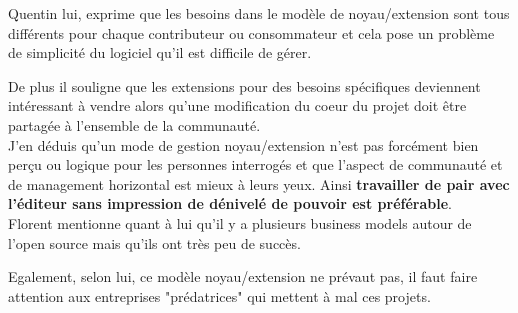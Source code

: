 			\newpage

			Quentin  lui, exprime que les besoins dans le modèle de noyau/extension sont tous différents pour chaque contributeur ou consommateur et cela pose un problème de simplicité du logiciel qu'il est difficile de gérer.

			\begin{center}
				\textit{
				}
			\end{center}

			De plus il souligne que les extensions pour des besoins spécifiques deviennent intéressant à vendre alors qu'une modification du coeur du projet doit être partagée à l'ensemble de la communauté.\\

			J'en déduis qu'un mode de gestion noyau/extension n'est pas forcément bien perçu ou logique pour les personnes interrogés et que l'aspect de communauté et de management horizontal est mieux à leurs yeux. Ainsi \textbf{travailler de pair avec l'éditeur sans impression de dénivelé de pouvoir est préférable}.\\

			Florent  mentionne quant à lui qu'il y a plusieurs business models autour de l'open source mais qu'ils ont très peu de succès.

			\begin{center}
				\textit{
				}
			\end{center}

			Egalement, selon lui, ce modèle noyau/extension ne prévaut pas, il faut faire attention aux entreprises "prédatrices" qui mettent à mal ces projets.

			\begin{center}
				\textit{
				}
			\end{center}

